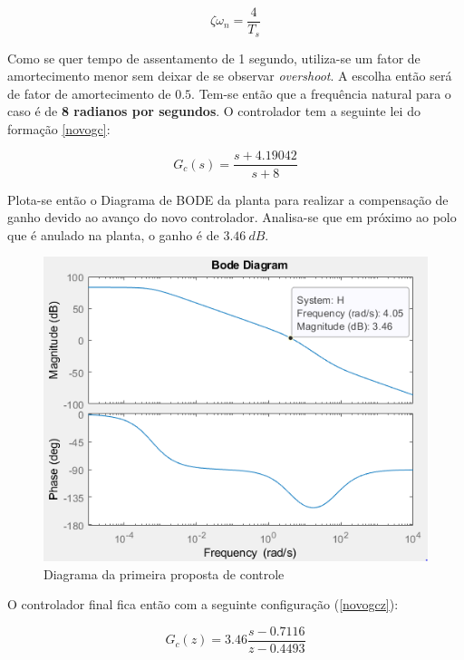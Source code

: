 \documentclass[a4paper,11pt]{article}
\begin{document}
\begin{equation}
\zeta \omega_{n}=\frac{4}{T_{s}}
\label{assentamento_eq}
\end{equation}

Como se quer tempo de assentamento de 1 segundo, utiliza-se um fator de amortecimento menor sem deixar de se observar \textit{overshoot}. A escolha então será de fator de amortecimento de $0.5$. Tem-se então que a frequência natural para o caso é de \textbf{8 radianos por segundos}. O controlador tem a seguinte lei do formação \ref{novogc}:

\begin{equation}
G_{c}(s)=\frac{s+4.19042}{s+8}
\label{novogc}
\end{equation}

Plota-se então o Diagrama de BODE da planta para realizar a compensação de ganho devido ao avanço do novo controlador. Analisa-se que em próximo ao polo que é anulado na planta, o ganho é de $3.46\ dB$.

\begin{figure}[H]
    \centering
    \includegraphics[width=\linewidth]{src/tex/img/bode.PNG}
    \caption{Diagrama da primeira proposta de controle}
    \label{fig:lgr}
\end{figure}

O controlador final fica então com a seguinte configuração (\ref{novogcz}):

\begin{equation}
G_{c}(z)=3.46\frac{s - 0.7116}{z - 0.4493}
\label{novogcz}
\end{equation}
\end{document}
